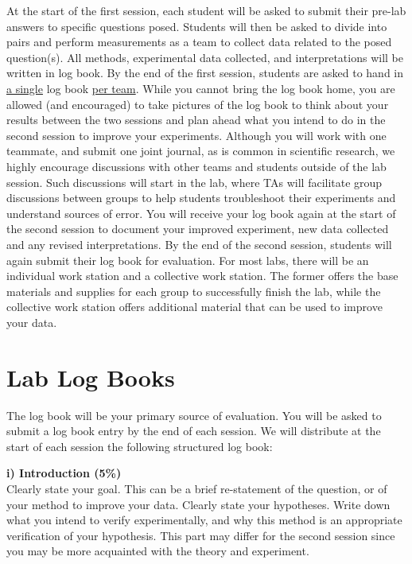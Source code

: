 \documentclass[12pt]{report}
\begin{document}
At the start of the first session, each student will be asked to submit their pre-lab answers to specific questions posed. Students will then be asked to divide into pairs and perform  measurements as a team to collect data related to the posed question(s). All methods, experimental data collected, and interpretations will be written in log book. By the end of the first session, students are asked to hand in \underline{a single} log book \underline{per team}. While you cannot bring the log book home, you are allowed (and encouraged) to take pictures of the log book to think about your results between the two sessions and plan ahead what you intend to do in the second session to improve your experiments. Although you will work with one teammate, and submit one joint journal, as is common in scientific research, we highly encourage discussions with other teams and students outside of the lab session. Such discussions will start in the lab, where TAs will facilitate group discussions between groups to help students troubleshoot their experiments and understand sources of error. You will receive your log book again at the start of the second session to document your improved experiment, new data collected and any revised interpretations. By the end of the second session, students will again submit their log book for evaluation. For most labs, there will be an individual work station and a collective work station. The former offers the base materials and supplies for each group to successfully finish the lab, while the collective work station offers additional material that can be used to improve your data.

{}
\section*{Lab Log Books}
The log book will be your primary source of evaluation. You will be asked to submit a log book entry by the end of each session. We will distribute at the start of each session the following structured log book:
 
\noindent \textbf{i) Introduction (5\%)}\\
\noindent Clearly state your goal. This can be a brief re-statement of the question, or of your method to improve your data. Clearly state your hypotheses. Write down what you intend to verify experimentally, and why this method is an appropriate verification of your hypothesis. This part may differ for the second session since you may be more acquainted with the theory and experiment. \\
\end{document}
